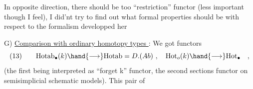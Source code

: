 In opposite direction, there should be too  ``restriction'' functor
(less important though I feel), I did'nt try to find out what  
formal properties should be with respect to the formalism developped her

G) \uline{Comparison with ordinary homotopy types }: We got functors
\[ (13)\qquad \mathrm{Hotab}_{\bullet}(k)\hand{\longrightarrow} \mathrm{Hotab} = D.(Ab) \ , \quad \mathrm{Hot}_{o}(k)\hand{\longrightarrow} \mathrm{Hot}_{\bullet} \quad , \]
(the first being interpreted as ``forget k'' functor, the second  
sections functor on semisimplicial schematic models). This pair of

